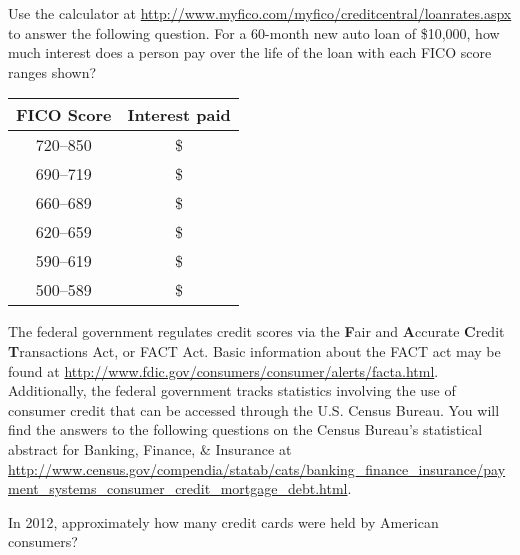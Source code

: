 \documentclass{ximera}
\begin{document}
\begin{question}
Use the calculator at \url{http://www.myfico.com/myfico/creditcentral/loanrates.aspx} to answer the following question. For a 60-month new auto loan of \$10,000, how much interest does a person pay over the life of the loan with each FICO score ranges shown?

\begin{free-response}
\begin{tabular}{@{}cc@{}}\toprule
 \textbf{FICO Score} & \textbf{Interest paid}\\\midrule
720--850 & \$\\
690--719 & \$\\
660--689 & \$\\
620--659 & \$\\
590--619 & \$\\
500--589 & \$\\
\bottomrule
\end{tabular}
\end{free-response}

\begin{comment}
\begin{solution}
\begin{expression-answer}
function validator(p) {
    if (p == 20)
      return 1;
    if (p == 0.2) {feedback( `What percentage does this value represent?')
    }
    if (p == 2) {feedback( `How would you represent $2\%$ as a decimal? Does this match your answer?')
    }
      return 0;
  }
\end{expression-answer}
\end{solution}
\end{comment}
\end{question}

The federal government regulates credit scores via the \textbf{F}air and \textbf{A}ccurate \textbf{C}redit \textbf{T}ransactions Act, or FACT Act. Basic information about the FACT act may be found at \url{http://www.fdic.gov/consumers/consumer/alerts/facta.html}. Additionally, the federal government tracks statistics involving the use of consumer credit that can be accessed through the U.S. Census Bureau. You will find the answers to the following questions on the Census Bureau's statistical abstract for Banking, Finance, \& Insurance at \url{http://www.census.gov/compendia/statab/cats/banking_finance_insurance/payment_systems_consumer_credit_mortgage_debt.html}.


\begin{question}
In 2012, approximately how many credit cards were held by American consumers?
  \begin{solution}
    \begin{multiple-choice}
    \end{multiple-choice}
  \end{solution}
\end{question}
\end{document}
